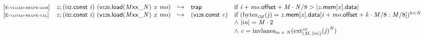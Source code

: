 \vspace{1ex}

$$
\begin{array}{@{}l@{}lcl@{}l@{}}
{[\textsc{\scriptsize E{-}vload{-}shape{-}oob}]} \quad & {\mathit{z}} ; (\mathsf{i{\scriptstyle32}}.\mathsf{const}~{\mathit{i}})~({\mathsf{v{\scriptstyle128}.load}}{({{{{{\mathit{M}}}{\mathsf{x}}}{\mathsf{x}}}{\mathsf{\_}}}{{\mathit{N}}})}~{\mathit{x}}~{\mathit{mo}}) &\hookrightarrow& \mathsf{trap} &\quad
  \mbox{if}~{\mathit{i}} + {\mathit{mo}}.\mathsf{offset} + {\mathit{M}} \cdot {\mathit{N}} / 8 > {|{{\mathit{z}}.\mathsf{mem}}{{}[{\mathit{x}}]}.\mathsf{data}|} \\
{[\textsc{\scriptsize E{-}vload{-}shape{-}val}]} \quad & {\mathit{z}} ; (\mathsf{i{\scriptstyle32}}.\mathsf{const}~{\mathit{i}})~({\mathsf{v{\scriptstyle128}.load}}{({{{{{\mathit{M}}}{\mathsf{x}}}{\mathsf{x}}}{\mathsf{\_}}}{{\mathit{N}}})}~{\mathit{x}}~{\mathit{mo}}) &\hookrightarrow& (\mathsf{v{\scriptstyle128}}.\mathsf{const}~{\mathit{c}}) &\quad
  \mbox{if}~({{\mathrm{bytes}}}_{{{\mathit{i}}}{{\mathit{M}}}}({\mathit{j}}) = {{\mathit{z}}.\mathsf{mem}}{{}[{\mathit{x}}]}.\mathsf{data}{}[{\mathit{i}} + {\mathit{mo}}.\mathsf{offset} + {\mathit{k}} \cdot {\mathit{M}} / 8 : {\mathit{M}} / 8])^{{\mathit{k}}<{\mathit{N}}} \\
 &&&&\quad {\land}~{|{\mathsf{i}}{{\mathit{n}}}|} = {\mathit{M}} \cdot 2 \\
 &&&&\quad {\land}~{\mathit{c}} = {{\mathrm{invlanes}}}_{{\mathsf{i}}{{\mathit{n}}}~\mathsf{x}~{\mathit{N}}}({{{{{\mathrm{ext}}}_{({\mathit{M}},\, {|{\mathsf{i}}{{\mathit{n}}}|})}^{{\mathit{sx}}}}}{({\mathit{j}})}^{{\mathit{N}}}}) \\
\end{array}
$$

\vspace{1ex}

